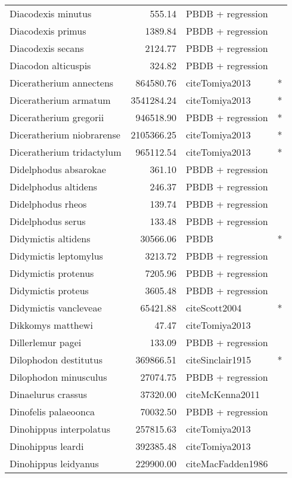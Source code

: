 \begin{table}[ht]
\begin{tabular}{lrll}
  Diacodexis minutus & 555.14 & PBDB + regression &  \\ 
  Diacodexis primus & 1389.84 & PBDB + regression &  \\ 
  Diacodexis secans & 2124.77 & PBDB + regression &  \\ 
  Diacodon alticuspis & 324.82 & PBDB + regression &  \\ 
  Diceratherium annectens & 864580.76 & cite{Tomiya2013} & * \\ 
  Diceratherium armatum & 3541284.24 & cite{Tomiya2013} & * \\ 
  Diceratherium gregorii & 946518.90 & PBDB + regression & * \\ 
  Diceratherium niobrarense & 2105366.25 & cite{Tomiya2013} & * \\ 
  Diceratherium tridactylum & 965112.54 & cite{Tomiya2013} & * \\ 
  Didelphodus absarokae & 361.10 & PBDB + regression &  \\ 
  Didelphodus altidens & 246.37 & PBDB + regression &  \\ 
  Didelphodus rheos & 139.74 & PBDB + regression &  \\ 
  Didelphodus serus & 133.48 & PBDB + regression &  \\ 
  Didymictis altidens & 30566.06 & PBDB & * \\ 
  Didymictis leptomylus & 3213.72 & PBDB + regression &  \\ 
  Didymictis protenus & 7205.96 & PBDB + regression &  \\ 
  Didymictis proteus & 3605.48 & PBDB + regression &  \\ 
  Didymictis vancleveae & 65421.88 & cite{Scott2004} & * \\ 
  Dikkomys matthewi & 47.47 & cite{Tomiya2013} &  \\ 
  Dillerlemur pagei & 133.09 & PBDB + regression &  \\ 
  Dilophodon destitutus & 369866.51 & cite{Sinclair1915} & * \\ 
  Dilophodon minusculus & 27074.75 & PBDB + regression &  \\ 
  Dinaelurus crassus & 37320.00 & cite{McKenna2011} &  \\ 
  Dinofelis palaeoonca & 70032.50 & PBDB + regression &  \\ 
  Dinohippus interpolatus & 257815.63 & cite{Tomiya2013} &  \\ 
  Dinohippus leardi & 392385.48 & cite{Tomiya2013} &  \\ 
  Dinohippus leidyanus & 229900.00 & cite{MacFadden1986} &  \\ 

\end{tabular}
\end{table}
